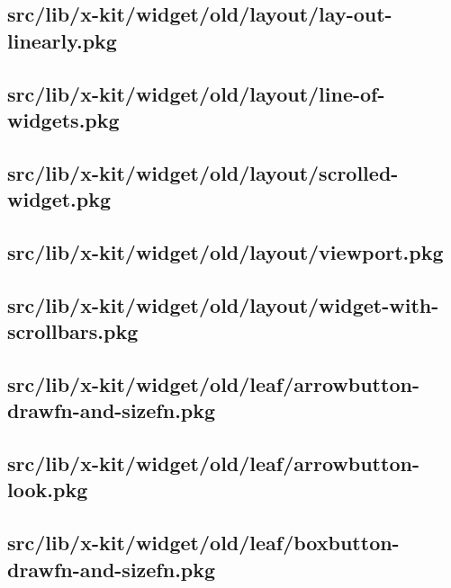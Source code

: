 \subsection{src/lib/x-kit/widget/old/layout/lay-out-linearly.pkg}


\subsection{src/lib/x-kit/widget/old/layout/line-of-widgets.pkg}


\subsection{src/lib/x-kit/widget/old/layout/scrolled-widget.pkg}


\subsection{src/lib/x-kit/widget/old/layout/viewport.pkg}


\subsection{src/lib/x-kit/widget/old/layout/widget-with-scrollbars.pkg}


\subsection{src/lib/x-kit/widget/old/leaf/arrowbutton-drawfn-and-sizefn.pkg}


\subsection{src/lib/x-kit/widget/old/leaf/arrowbutton-look.pkg}


\subsection{src/lib/x-kit/widget/old/leaf/boxbutton-drawfn-and-sizefn.pkg}


